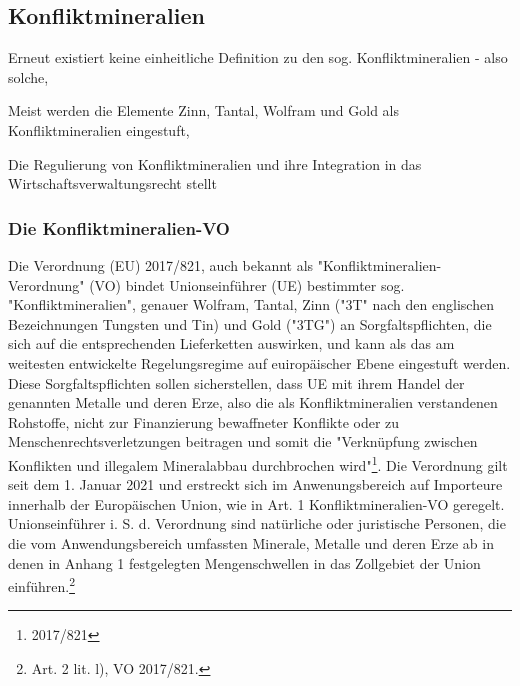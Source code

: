 \documentclass[12pt,a4paper,oneside]{book} %
\begin{document}
	
	\subsection{Konfliktmineralien}
	Erneut existiert keine einheitliche Definition zu den sog. Konfliktmineralien - also solche, 
	
	Meist werden die Elemente Zinn, Tantal, Wolfram und Gold als Konfliktmineralien eingestuft, 
	
	Die Regulierung von Konfliktmineralien und ihre Integration in das Wirtschaftsverwaltungsrecht stellt 
	
	\subsubsection{Die Konfliktmineralien-VO}
	Die Verordnung (EU) 2017/821, auch bekannt als "Konfliktmineralien-Verordnung" (VO) bindet Unionseinführer (UE) bestimmter sog. "Konfliktmineralien", genauer Wolfram, Tantal, Zinn ("3T" nach den englischen Bezeichnungen Tungsten und Tin) und Gold ("3TG") an Sorgfaltspflichten, die sich auf die entsprechenden Lieferketten auswirken, und kann als das am weitesten entwickelte Regelungsregime auf euiropäischer Ebene eingestuft werden\autocite{Kalls, ZfPW 2024, 181, 199}. Diese Sorgfaltspflichten sollen sicherstellen, dass UE mit ihrem Handel der genannten Metalle und deren Erze, also die als Konfliktmineralien verstandenen Rohstoffe, nicht zur Finanzierung bewaffneter Konflikte oder zu Menschenrechtsverletzungen beitragen und somit die "Verknüpfung zwischen Konflikten und illegalem Mineralabbau durchbrochen wird"\footnote{2017/821}. Die Verordnung gilt seit dem 1. Januar 2021 und erstreckt sich im Anwenungsbereich auf Importeure innerhalb der Europäischen Union, wie in Art. 1 Konfliktmineralien-VO geregelt. Unionseinführer i. S. d. Verordnung sind natürliche oder juristische Personen, die die vom Anwendungsbereich umfassten Minerale, Metalle und deren Erze ab in denen in Anhang 1 festgelegten Mengenschwellen in das Zollgebiet der Union einführen.\footnote{Art. 2 lit. l), VO 2017/821.} 
	
\end{document}
